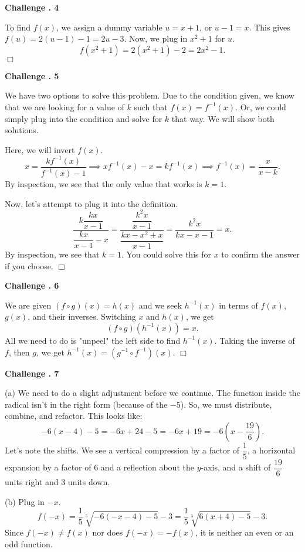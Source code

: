 \documentclass[lang=en,11pt]{elegantbook}
\begin{document}
\noindent \textbf{Challenge . 4}

To find $f(x)$, we assign a dummy variable $u=x+1$, or $u-1=x$.  This gives $f(u)=2(u-1)-1=2u-3$.  Now, we plug in $x^2+1$ for $u$.
$$f\left(x^2+1\right)=2\left(x^2+1\right)-2=\boxed{2x^2-1}.$$ $\Box$

\noindent \textbf{Challenge . 5}

We have two options to solve this problem.  Due to the condition given, we know that we are looking for a value of $k$ such that $f(x)=f^{-1}(x)$.  Or, we could simply plug into the condition and solve for $k$ that way.  We will show both solutions.

Here, we will invert $f(x)$.  $$x=\dfrac{kf^{-1}(x)}{f^{-1}(x)-1} \implies xf^{-1}(x)-x=kf^{-1}(x) \implies f^{-1}(x)=\dfrac{x}{x-k}.$$
By inspection, we see that the only value that works is $\boxed{k=1}$.

Now, let's attempt to plug it into the definition. $$\dfrac{k\dfrac{kx}{x-1}}{\dfrac{kx}{x-1}-x}=\dfrac{\dfrac{k^2x}{x-1}}{\dfrac{kx-x^2+x}{x-1}}=\dfrac{k^2x}{kx-x-1}=x.$$
By inspection, we see that $k=1$.  You could solve this for $x$ to confirm the answer if you choose. $\Box$\vspace{3mm}

\noindent \textbf{Challenge . 6}

We are given $(f \circ g)(x)=h(x)$ and we seek $h^{-1}(x)$ in terms of $f(x)$, $g(x)$, and their inverses.  Switching $x$ and $h(x)$, we get $$(f\circ g)\left(h^{-1}(x)\right)=x.$$  All we need to do is "unpeel" the left side to find $h^{-1}(x)$.  Taking the inverse of $f$, then $g$, we get $\boxed{h^{-1}(x)=\left(g^{-1}\circ f^{-1}\right)(x)}$. $\Box$\vspace{3mm}

\noindent \textbf{Challenge . 7}

(a) We need to do a slight adjustment before we continue.  The function inside the radical isn't in the right form (because of the $-5$).  So, we must distribute, combine, and refactor.  This looks like: $$-6(x-4)-5=-6x+24-5=-6x+19=-6\left(x-\dfrac{19}{6}\right).$$  Let's note the shifts.  We see a vertical compression by a factor of $\dfrac{1}{5}$, a horizontal expansion by a factor of $6$ and a reflection about the $y$-axis, and a shift of $\dfrac{19}{6}$ units right and $3$ units down.

(b) Plug in $-x$.  $$f(-x)=\dfrac{1}{5}\sqrt[5]{-6(-x-4)-5}-3=\dfrac{1}{5}\sqrt[5]{6(x+4)-5}-3.$$
Since $f(-x)\neq f(x)$ nor does $f(-x)=-f(x)$, it is $\boxed{\text{neither}}$ an even or an odd function.
\end{document}
